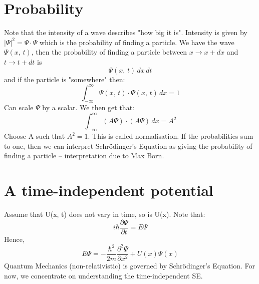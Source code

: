 \documentclass[a4paper, 11pt, normalem]{report}
\begin{document}
\section{Probability}
Note that the intensity of a wave describes "how big it is".
Intensity is given by $|\Psi|^{2} = \Psi\cdot\Psi$ which is the probability of finding a particle.
We have the wave $\Psi(x,\,t)$, then the probability of finding a particle between $x \rightarrow x + dx$ and $t \rightarrow t + dt$ is
\begin{equation}
    \Psi(x,\,t)\,dx\,dt
\end{equation}
and if the particle is "somewhere" then:
\begin{equation}
    \int_{-\infty}^{\infty} \Psi(x,\,t) \cdot \Psi(x,\,t)\,dx = 1
\end{equation}
Can scale $\Psi$ by a scalar.
We then get that:
\begin{equation}
    \int_{-\infty}^{\infty} (A\Psi) \cdot (A\Psi)\,dx = A^{2}
\end{equation}
Choose A such that $A^{2} = 1$.
This is called normalisation.
If the probabilities sum to one, then we can interpret Schr\"{o}dinger's Equation as giving the probability of finding a particle -- interpretation due to Max Born.

\section{A time-independent potential}
Assume that U(x, t) does not vary in time, so is U(x).
Note that:
\begin{equation}
    i\hbar\frac{\partial\Psi}{\partial t} = E\Psi
\end{equation}
Hence,
\begin{equation}
    E\Psi = -\frac{\hbar^{2}}{2m}\frac{\partial^{2} \Psi}{\partial x^{2}} + U(x)\Psi(x)
\end{equation}
Quantum Mechanics (non-relativistic) is governed by Schr\"{o}dinger's Equation.
For now, we concentrate on understanding the time-independent SE.
\end{document}
